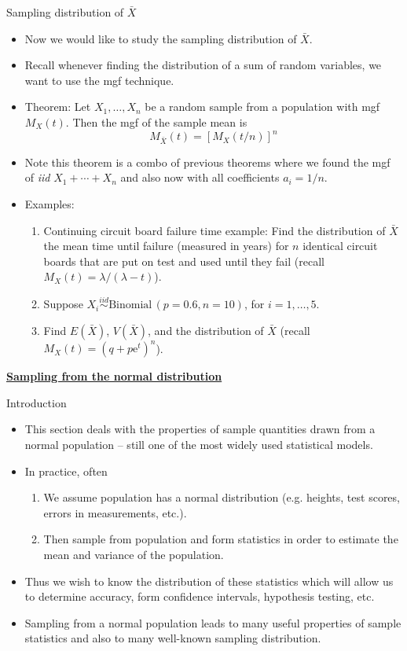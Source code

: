 \documentclass{article}
\newcommand{\bu}[1]{\textbf{\ul{#1}}}				%
\newcommand{\vecn}[2]{#1_1, \ldots, #1_{#2}}	%
\newcommand{\e}{\mathrm{e}}		%
\newcommand{\followsp}[2]{\overset{#1}\sim \text{#2}\,}		%
\begin{document}
Sampling distribution of $\bar{X}$\bigskip
\begin{itemize}
    \item Now we would like to study the sampling distribution of $\bar{X}$.
    \item[] Recall whenever finding the distribution of a sum of random variables, we want to use the mgf technique.
    \item Theorem: Let $\vecn{X}{n}$ be a random sample from a population with mgf $M_X(t)$. Then the mgf of the sample mean is
    \[M_{\bar{X}}(t) = [M_X(t / n)]^n\]
    \item[] Note this theorem is a combo of previous theorems where we found the mgf of \textit{iid} $X_1 + \cdots + X_n$ and also now with all coefficients $a_i = 1/n$.
    \item Examples:
    \begin{enumerate}
        \item Continuing circuit board failure time example: Find the distribution of $\bar{X}$ the mean time until failure (measured in years) for $n$ identical circuit boards that are put on test and used until they fail (recall $M_X(t) = \lambda / (\lambda - t)$).\vspace{80pt}
        \item Suppose $X_i \followsp{iid}{Binomial}(p = 0.6, n = 10)$, for $i = 1, \ldots, 5$.
        \item[] Find $E(\bar{X})$, $V(\bar{X})$, and the distribution of $\bar{X}$ (recall $M_X(t) = (q + p\e^t)^n$).\vspace{200pt}
    \end{enumerate}
\end{itemize}\bigskip

\bu{Sampling from the normal distribution}\bigskip

Introduction\bigskip
\begin{itemize}
    \item This section deals with the properties of sample quantities drawn from a normal population -- still one of the most widely used statistical models.
    \item In practice, often
    \begin{enumerate}
        \item We assume population has a normal distribution (e.g. heights, test scores, errors in measurements, etc.).
        \item Then sample from population and form statistics in order to estimate the mean and variance of the population.
    \end{enumerate}
    \item Thus we wish to know the distribution of these statistics which will allow us to determine accuracy, form confidence intervals, hypothesis testing, etc.
    \item[] Sampling from a normal population leads to many useful properties of sample statistics and also to many well-known sampling distribution. 
\end{itemize}\bigskip
\end{document}
